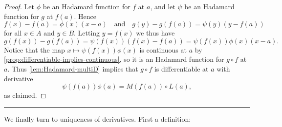 \documentclass[article, a4paper, 11pt, oneside]{memoir}
\numberwithin{equation}{chapter}
\newcommand\fleuronbreak{\fancybreak{\textcolor{linkcolor}{\adfhangingflatleafleft}}}
\begin{document}
\begin{proof}
    Let $\phi$ be an Hadamard function for $f$ at $a$, and let $\psi$ be an Hadamard function for $g$ at $f(a)$. Hence
    \begin{equation*}
        f(x) - f(a)
            = \phi(x)(x - a)
        \quad \text{and} \quad
        g(y) - g(f(a))
            = \psi(y)(y - f(a))
    \end{equation*}
    for all $x \in A$ and $y \in B$. Letting $y = f(x)$ we thus have
    \begin{equation*}
        g(f(x)) - g(f(a))
            = \psi(f(x))(f(x) - f(a))
            = \psi(f(x))\phi(x)(x - a).
    \end{equation*}
    Notice that the map $x \mapsto \psi(f(x))\phi(x)$ is continuous at $a$ by \cref{prop:differentiable-implies-continuous}, so it is an Hadamard function for $g \circ f$ at $a$. Thus \cref{lem:Hadamard-multiD} implies that $g \circ f$ is differentiable at $a$ with derivative
    \begin{equation*}
        \psi(f(a)) \phi(a)
            = M(f(a)) \circ L(a),
    \end{equation*}
    as claimed.
\end{proof}

\fleuronbreak

We finally turn to uniqueness of derivatives. First a definition:
\end{document}
